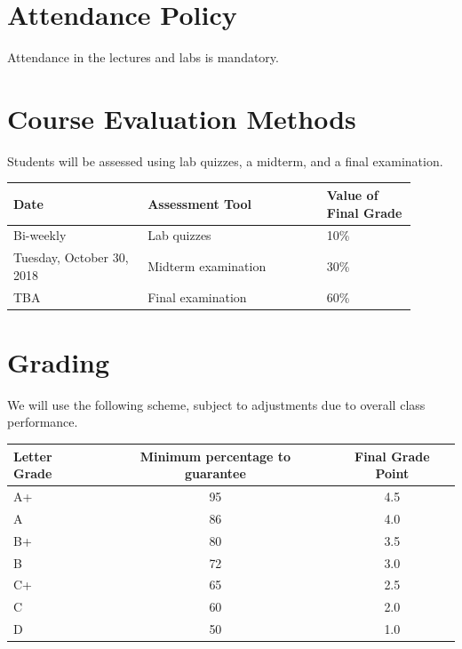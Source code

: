 \documentclass[12pt]{article}
\begin{document}
\section{Attendance Policy}

Attendance in the lectures and labs is mandatory.

\section{Course Evaluation Methods}

Students will be assessed using lab quizzes, a midterm, and a final examination.

\begin{center}
\begin{tabular}[t]{p{0.3\linewidth}p{0.4\linewidth}p{0.2\linewidth}}
\toprule
\mbox{}\newline \textbf{Date} &	\mbox{}\newline\textbf{Assessment Tool}	& \textbf{Value of \newline Final Grade} \\
\midrule
Bi-weekly & Lab quizzes & 10\% \\
Tuesday, October 30, 2018 & Midterm examination & 30\% \\
TBA & Final examination & 60\% \\
\bottomrule
\end{tabular}
\end{center}

\section{Grading}

We will use the following scheme, subject to adjustments due to overall class performance.

\begin{center}
\begin{tabular}[t]{lcc}
\toprule
Letter Grade & Minimum percentage to guarantee & Final Grade Point  \\
\midrule
A+ & 95 & 4.5 \\
A & 86 & 4.0 \\
B+ & 80 & 3.5 \\
B & 72 &  3.0 \\
C+ & 65  & 2.5 \\
C & 60 & 2.0 \\
D & 50 & 1.0  \\
\bottomrule
\end{tabular}
\end{center}
\end{document}
